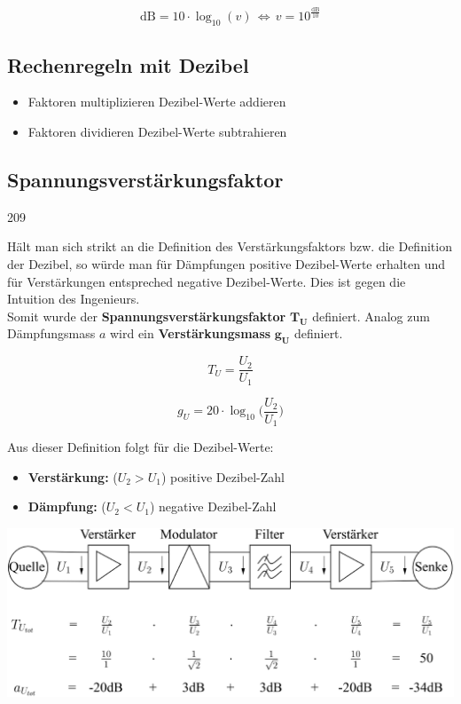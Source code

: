 $$ \boxed{ \mathrm{dB} = 10 \cdot \log_{10} (v) \, \Leftrightarrow \, v = 10^{\frac{\mathrm{dB}}{10}} } $$


\subsection{Rechenregeln mit Dezibel}

\begin{itemize}
    \item Faktoren multiplizieren \textrightarrow Dezibel-Werte addieren
    \item Faktoren dividieren \textrightarrow Dezibel-Werte subtrahieren
\end{itemize}


\subsection{Spannungsverstärkungsfaktor}{209}

Hält man sich strikt an die Definition des Verstärkungsfaktors bzw. die Definition der Dezibel, so würde man für Dämpfungen positive
Dezibel-Werte erhalten und für Verstärkungen entspreched negative Dezibel-Werte. Dies ist gegen die Intuition des Ingenieurs. \\
Somit wurde der \textbf{Spannungsverstärkungsfaktor} $\boldsymbol{T_U}$ definiert. Analog zum Dämpfungsmass $a$ wird ein 
\textbf{Verstärkungsmass} $\boldsymbol{g_U}$ definiert.

\begin{minipage}[c]{0.48\columnwidth}
    $$ \boxed{ T_U = \frac{U_2}{U_1} } $$
\end{minipage}
\hfill
\begin{minipage}[c]{0.48\columnwidth}
    $$ \boxed{ g_U = 20 \cdot \log_{10} \Big( \frac{U_2}{U_1} \Big) } $$
\end{minipage}


Aus dieser Definition folgt für die Dezibel-Werte:

\begin{itemize}
    \item \textbf{Verstärkung: } ($U_2 > U_1$) \textrightarrow positive Dezibel-Zahl
    \item \textbf{Dämpfung: } ($U_2 < U_1$) \textrightarrow negative Dezibel-Zahl
\end{itemize}



\includegraphics[width=0.9\columnwidth]{images/kaskadierung_verstaerkung_daempfung.png}

